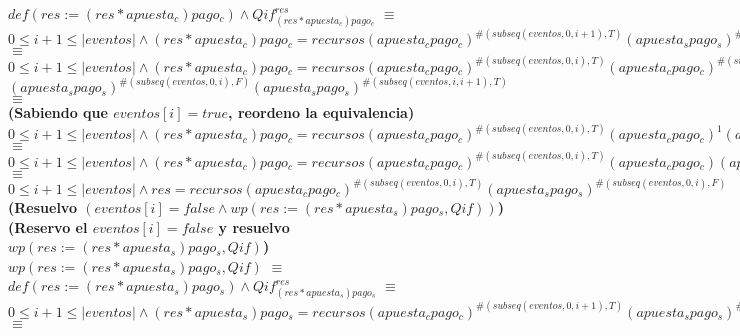 \documentclass[10pt,a4paper]{article}
\begin{document}
\begin{flushleft}
\begin{enumerate}
	$def(res:=(res*apuesta_c)pago_c) \land Qif_{(res*apuesta_c)pago_c}^{res}$ $\equiv$\\
	\vspace{2mm}
	$0 \leq i+1 \leq |eventos| \wedge (res*apuesta_c)pago_c= recursos(apuesta_cpago_c)^{\# (subseq(eventos,0,i+1),T)}(apuesta_spago_s)^{\# (subseq(eventos,0,i+1),F)}$ $\equiv$\\
	\vspace{2mm}
	$0 \leq i+1 \leq |eventos| \wedge (res*apuesta_c)pago_c= recursos(apuesta_cpago_c)^{\# (subseq(eventos,0,i),T)}(apuesta_cpago_c)^{\# (subseq(eventos,i,i+1),T)}$ \\
	\vspace{1mm}
	$(apuesta_spago_s)^{\# (subseq(eventos,0,i),F)}(apuesta_spago_s)^{\# (subseq(eventos,i,i+1),T)}$ $\equiv$\\
	\vspace{3mm}
	\textbf{(Sabiendo que $eventos[i]=true$, reordeno la equivalencia)}\\
	\vspace{2mm}
	$0 \leq i+1 \leq |eventos| \wedge (res*apuesta_c)pago_c= recursos(apuesta_cpago_c)^{\# (subseq(eventos,0,i),T)}(apuesta_cpago_c)^{1}(apuesta_spago_s)^{\# (subseq(eventos,0,i),F)}(apuesta_spago_s)^{0}$ $\equiv$\\
	\vspace{2mm}
	$0 \leq i+1 \leq |eventos| \wedge (res*apuesta_c)pago_c= recursos(apuesta_cpago_c)^{\# (subseq(eventos,0,i),T)}(apuesta_cpago_c)(apuesta_spago_s)^{\# (subseq(eventos,0,i),F)}$ $\equiv$\\
	\vspace{2mm}
	$0 \leq i+1 \leq |eventos| \wedge res= recursos(apuesta_cpago_c)^{\# (subseq(eventos,0,i),T)}(apuesta_spago_s)^{\# (subseq(eventos,0,i),F)}$ \\
	\vspace{8mm}
	\textbf{(Resuelvo $(eventos[i]=false \wedge wp (res:=(res*apuesta_s)pago_s,Qif))$) }\\
	\vspace{2mm}
	\textbf{(Reservo el $eventos[i]=false$ y resuelvo $wp (res:=(res*apuesta_s)pago_s,Qif)$)}\\
	\vspace{2mm}
	$wp (res:=(res*apuesta_s)pago_s,Qif)$ $\equiv$\\
	\vspace{2mm}
	$def(res:=(res*apuesta_s)pago_s) \land Qif_{(res*apuesta_s)pago_s}^{res}$ $\equiv$\\
	\vspace{2mm}
	$0 \leq i+1 \leq |eventos| \wedge (res*apuesta_s)pago_s= recursos(apuesta_cpago_c)^{\# (subseq(eventos,0,i+1),T)}(apuesta_spago_s)^{\# (subseq(eventos,0,i+1),F)}$ $\equiv$\\

\end{enumerate}
\end{flushleft}
\end{document}
